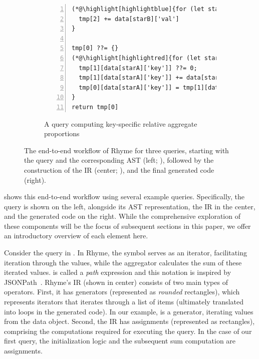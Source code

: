 \documentclass[runningheads]{llncs}
\newcommand{\lang}{Rhyme}
\begin{document}
\begin{figure}[t!]
\begin{subfigure}{\textwidth}
\begin{minipage}{0.38\textwidth}
\begin{lstlisting}[style=JavaScriptTiny, columns=flexible, numbers=left, xleftmargin=2pt]
(*@\highlight[highlightblue]{for (let starB in data)}@*) {  // loop hoisted!
  tmp[2] += data[starB]['val']
}

tmp[0] ??= {}
(*@\highlight[highlightred]{for (let starA in data)}@*) {
  tmp[1][data[starA]['key']] ??= 0;
  tmp[1][data[starA]['key']] += data[starA]['val']
  tmp[0][data[starA]['key']] = tmp[1][data[starA]['key']] / tmp[2] (*@\label{line:deps}@*)
}
return tmp[0]
\end{lstlisting}
\end{minipage}
\vspace{-2mm}
\caption{A query computing key-specific 
relative aggregate proportions
}\label{fig:intro_q3}
\end{subfigure}
\vspace{-2mm}
\caption{
The end-to-end workflow of \lang{} for three queries, starting with the query
and the corresponding AST (left; ),
followed by the construction of the IR (center; ), and the final generated code (right).
}\label{fig:intro} 
\vspace{-7mm}
\end{figure}

 shows this end-to-end workflow using several example queries.
Specifically, the query is shown on the left, alongside its AST representation,
the IR in the center, and the generated code on the right.
While the comprehensive exploration of these components will be the focus of
subsequent sections in this paper, we offer an introductory overview of each
element here.

Consider the query in .
In \lang{}, the \inline{*} symbol serves as an iterator, facilitating iteration through
the  values, while the aggregator  calculates the sum of
these iterated values.
 is called a \emph{path} expression and this notation is inspired by JSONPath~\cite{jsonpath}.
\lang{}'s IR (shown in center) consists of two main types of operators.
First, it has generators (represented as \emph{rounded} rectangles), which represents iterators
that iterates through a list of items (ultimately translated into loops in
the generated code).
In our example,  is a generator, iterating values from the data object.
Second, the IR has assignments (represented as rectangles), comprising the
computations required for executing the query.
In the case of our first query, the initialization logic  and
the subsequent sum computation  are assignments.
\end{document}
